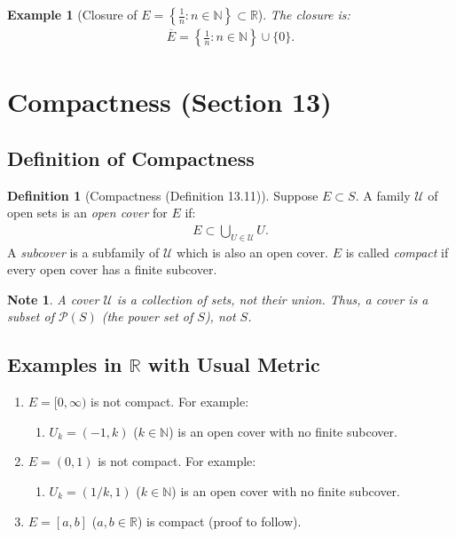 \documentclass[9pt]{article}
\theoremstyle{definition}
\newtheorem{definition}{Definition}
\theoremstyle{plain}
\newtheorem{example}{Example}
\newtheorem{note}{Note}
\begin{document}
\begin{example}[Closure of $ E = \left\{\frac{1}{n} : n \in \mathbb{N}\right\} \subset \mathbb{R} $]
The closure is:
\begin{align}
\overline{E} = \left\{\frac{1}{n} : n \in \mathbb{N}\right\} \cup \{0\}.
\end{align}
\end{example}
\section*{Compactness (Section 13)}

\subsection*{Definition of Compactness}
\begin{definition}[Compactness (Definition 13.11)]
Suppose $ E \subset S $. A family $ \mathcal{U} $ of open sets is an \emph{open cover} for $ E $ if:
\begin{align}
E \subset \bigcup_{U \in \mathcal{U}} U.
\end{align}
A \emph{subcover} is a subfamily of $ \mathcal{U} $ which is also an open cover. $ E $ is called \emph{compact} if every open cover has a finite subcover.
\end{definition}

\begin{note}
A cover $ \mathcal{U} $ is a collection of sets, not their union. Thus, a cover is a subset of $ \mathcal{P}(S) $ (the power set of $ S $), not $ S $.
\end{note}

\subsection*{Examples in $ \mathbb{R} $ with Usual Metric}
\begin{enumerate}
    \item $ E = [0, \infty) $ is not compact. For example:
    \begin{enumerate}
        \item $ U_k = (-1, k) $ ($ k \in \mathbb{N} $) is an open cover with no finite subcover.
    \end{enumerate}
    \item $ E = (0, 1) $ is not compact. For example:
    \begin{enumerate}
        \item $ U_k = (1/k, 1) $ ($ k \in \mathbb{N} $) is an open cover with no finite subcover.
    \end{enumerate}
    \item $ E = [a, b] $ ($ a, b \in \mathbb{R} $) is compact (proof to follow).
\end{enumerate}
\end{document}
